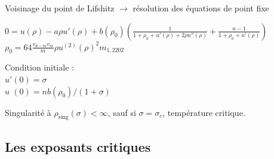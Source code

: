 \documentclass[xcolor=dvipsnames]{beamer}
\begin{document}
\begin{frame}
Voisinage du point de Lifshitz $\rightarrow$ résolution des équations de point fixe 
\begin{block}{}
$0 = u(\rho) - a  \rho u'(\rho) + b(\rho_0) \left( \frac{1}{1 + \rho_0 + u'(\rho) + 2 \rho u''(\rho)} + \frac{n-1}{1+\rho_0+u'(\rho)} \right)$ \\
$\rho_0 = 64 \frac{ v_{d-m} v_m}{m} \rho u^{(2)}(\rho)^2 m_{1,2202} $ \\
\end{block}

Condition initiale :\\
$u'(0) = \sigma$ \\
$u\phantom{'}(0) = n b(\rho_0)/(1+\sigma)$

\begin{block}{}
Singularité à $\rho_\text{sing}(\sigma)<\infty$, sauf si $\sigma = \sigma_c$, \textcolor{BrickRed}{température critique}.
\end{block}


\end{frame}

\subsection{Les exposants critiques}
\end{document}
